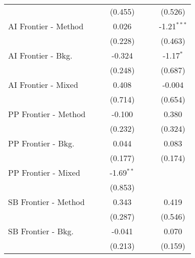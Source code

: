 \begin{tabular}{lcccccc}
                        &               &               & (0.455)      &               &             & (0.526)\\   
   AI Frontier - Method &               &               & 0.026        &               &             & -1.21$^{***}$\\   
                        &               &               & (0.228)      &               &             & (0.463)\\   
   AI Frontier - Bkg.   &               &               & -0.324       &               &             & -1.17$^{*}$\\   
                        &               &               & (0.248)      &               &             & (0.687)\\   
   AI Frontier - Mixed  &               &               & 0.408        &               &             & -0.004\\   
                        &               &               & (0.714)      &               &             & (0.654)\\   
   PP Frontier - Method &               &               & -0.100       &               &             & 0.380\\   
                        &               &               & (0.232)      &               &             & (0.324)\\   
   PP Frontier - Bkg.   &               &               & 0.044        &               &             & 0.083\\   
                        &               &               & (0.177)      &               &             & (0.174)\\   
   PP Frontier - Mixed  &               &               & -1.69$^{**}$ &               &             &   \\   
                        &               &               & (0.853)      &               &             &   \\   
   SB Frontier - Method &               &               & 0.343        &               &             & 0.419\\   
                        &               &               & (0.287)      &               &             & (0.546)\\   
   SB Frontier - Bkg.   &               &               & -0.041       &               &             & 0.070\\   
                        &               &               & (0.213)      &               &             & (0.159)\\   

\end{tabular}
